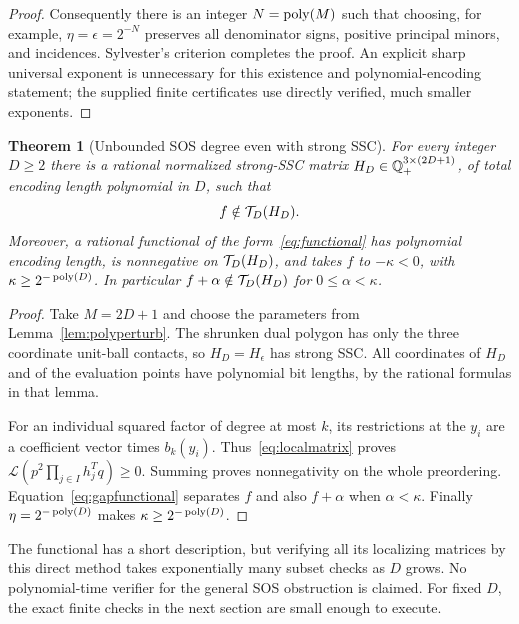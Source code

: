 \documentclass[11pt]{article}
\newtheorem{theorem}{Theorem}[section]
\theoremstyle{definition}\newtheorem{definition}[theorem]{Definition}
\begin{document}
\begin{proof}
Consequently there is an integer $N=\operatorname{poly}(M)$ such that choosing, for example, $\eta=\epsilon=2^{-N}$ preserves all denominator signs, positive principal minors, and incidences. Sylvester's criterion completes the proof. An explicit sharp universal exponent is unnecessary for this existence and polynomial-encoding statement; the supplied finite certificates use directly verified, much smaller exponents.
\end{proof}

\begin{theorem}[Unbounded SOS degree even with strong SSC]
\label{thm:strongsos}
For every integer $D\ge2$ there is a rational normalized strong-SSC matrix $H_D\in\mathbb Q_+^{3\times(2D+1)}$, of total encoding length polynomial in $D$, such that
\begin{equation}
 f\notin\mathcal T_D(H_D).
 \label{eq:strongfailure}
\end{equation}
Moreover, a rational functional of the form~\eqref{eq:functional} has polynomial encoding length, is nonnegative on $\mathcal T_D(H_D)$, and takes $f$ to $-\kappa<0$, with $\kappa\ge2^{-\operatorname{poly}(D)}$. In particular $f+\alpha\notin\mathcal T_D(H_D)$ for $0\le\alpha<\kappa$.
\end{theorem}
\begin{proof}
Take $M=2D+1$ and choose the parameters from Lemma~\ref{lem:polyperturb}. The shrunken dual polygon has only the three coordinate unit-ball contacts, so $H_D=H_\epsilon$ has strong SSC. All coordinates of $H_D$ and of the evaluation points have polynomial bit lengths, by the rational formulas in that lemma.

For an individual squared factor of degree at most $k$, its restrictions at the $y_i$ are a coefficient vector times $b_k(y_i)$. Thus~\eqref{eq:localmatrix} proves $\mathcal L(p^2\prod_{j\in I}h_j^Tq)\ge0$. Summing proves nonnegativity on the whole preordering. Equation~\eqref{eq:gapfunctional} separates $f$ and also $f+\alpha$ when $\alpha<\kappa$. Finally $\eta=2^{-\operatorname{poly}(D)}$ makes $\kappa\ge2^{-\operatorname{poly}(D)}$.
\end{proof}

The functional has a short description, but verifying all its localizing matrices by this direct method takes exponentially many subset checks as $D$ grows. No polynomial-time verifier for the general SOS obstruction is claimed. For fixed $D$, the exact finite checks in the next section are small enough to execute.
\end{document}
